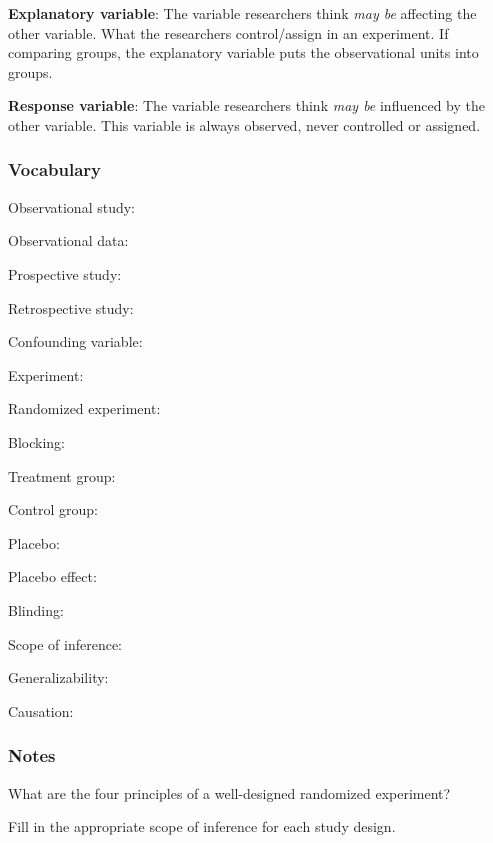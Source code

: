 \documentclass[
]{report}
\newcommand{\rgs}{\vspace{12pt}} %
\newcommand{\rgi}{\hspace{24pt}}  %
\begin{document}
\textbf{Explanatory variable}: The variable researchers think \emph{may be} affecting the other variable. What the researchers control/assign in an experiment. If comparing groups, the explanatory variable puts the observational units into groups.

\textbf{Response variable}: The variable researchers think \emph{may be} influenced by the other variable. This variable is always observed, never controlled or assigned.

\hypertarget{vocabulary-2}{%
\subsubsection*{Vocabulary}\label{vocabulary-2}}

Observational study:
\rgs

\rgi Observational data:
\rgs

\rgi Prospective study:
\rgs

\rgi Retrospective study:
\rgs

Confounding variable:
\rgs

Experiment:
\rgs

\rgi Randomized experiment:
\rgs

\rgi Blocking:
\rgs

\rgi Treatment group:
\rgs

\rgi Control group:
\rgs

\rgi Placebo:
\rgs

\rgi Placebo effect:
\rgs

\rgi Blinding:
\rgs

Scope of inference:
\rgs

Generalizability:
\rgs

Causation:
\rgs

\hypertarget{notes-2}{%
\subsubsection*{Notes}\label{notes-2}}

What are the four principles of a well-designed randomized experiment?\\
\rgs
\rgs
\rgs

Fill in the appropriate scope of inference for each study design.
\end{document}

